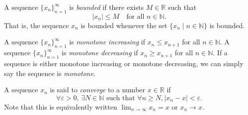 \documentclass[../main.tex]{subfiles}
\begin{document}
    
    
    
    
    
    
    \begin{definition} \label{def:bounded sequence}
    A sequence \( \{x_n\}_{n=1}^{\infty}\) is \textit{bounded} if there exists \( M \in \mathbb{R}\) such that 
    \[
    |x_n| \leq M \quad \text{for all } n \in \mathbb{N}.
    \]
    That is, the sequence \(x_n\) is bounded whenever the set $\{ x_n \mid n \in \mathbb{N} \}$ is bounded.
    \end{definition}
    
    
    
    
    
    
    
    
    
    
    
    
    \begin{definition}\label{def:Monotone_sequence}
    A sequence \(\{x_n\}_{n=1}^{\infty}\) is \textit{monotone increasing} if \( x_n \leq x_{n+1} \) for all \( n \in \mathbb{N} \). A sequence \(\{x_n\}_{n=1}^{\infty}\) is \textit{monotone decreasing} if \( x_n \geq x_{n+1} \) for all \( n \in \mathbb{N} \). If a sequence is either monotone increasing or monotone decreasing, we can simply say the sequence is \textit{monotone}.
    \end{definition}
    
    
    
    
    
    
    
    
    
    
    
    
    
    
    
    
    
    
    
    
    
    \begin{definition} \label{def:convergent_sequence}
    A sequence \(x_n\) is said to \textit{converge} to a number \( x \in \mathbb{R}\) if 
    \[
    \forall \varepsilon > 0, \, \exists N \in \mathbb{N} \text{ such that } \forall n \geq N, |x_n - x| < \varepsilon.
    \]
    Note that this is equivalently written \( \lim_{n \to \infty} x_n = x\) or \(x_n \longrightarrow x \).
    
    \end{definition}
    
\end{document}
